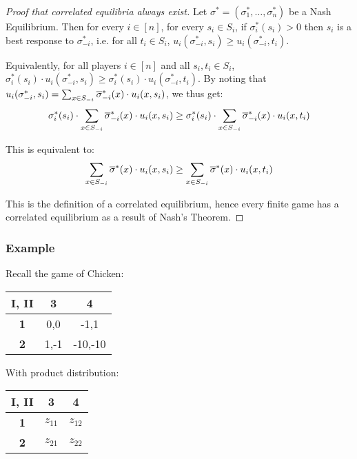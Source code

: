 	\begin{proof}[Proof that correlated equilibria always exist]
		Let $\sigma^* = (\sigma^*_1, \ldots, \sigma^*_n)$ be a Nash
		Equilibrium.  Then for every $i \in [n]$, for every $s_i \in S_i$, if
		$\sigma^*_i(s_i) > 0$ then $s_i$ is a best response to $\sigma^*_{-i}$,
		i.e. for all $t_i \in S_i$, $u_i(\sigma^*_{-i}, s_i) \ge
		u_i(\sigma^*_{-i}, t_i)$.

		Equivalently, for all players $i \in [n]$ and all $s_i, t_i \in S_i$,
		$\sigma^*_i (s_i) \cdot u_i(\sigma^*_{-i}, s_i) \ge \sigma^*_i (s_i) \cdot
		u_i(\sigma^*_{-i}, t_i)$. By noting that $u_i(\sigma^*_{-i}, s_i) =
		\sum_{x \in S_{-i}} \overline{\sigma}^*_{-i} (x) \cdot u_i(x, s_i)$, we
		thus get:
		\begin{equation*}
			\sigma^*_i (s_i) \cdot \sum_{x \in S_{-i}} \overline{\sigma}^*_{-i} (x)
			\cdot u_i(x, s_i) \ge \sigma^*_i (s_i) \cdot \sum_{x \in S_{-i}}
			\overline{\sigma}^*_{-i} (x) \cdot u_i(x, t_i)
		\end{equation*}

		This is equivalent to:
		\begin{equation*}
			\sum_{x \in S_{-i}} \overline{\sigma}^* (x) \cdot u_i(x, s_i) \ge
			\sum_{x \in S_{-i}} \overline{\sigma}^* (x) \cdot u_i(x, t_i)
		\end{equation*}

		This is the definition of a correlated equilibrium, hence every finite
		game has a correlated equilibrium as a result of Nash's Theorem.
	\end{proof}

	\subsubsection{Example}
		Recall the game of Chicken:
		\begin{center}
			\begin{tabular}{|c|c|c|}
				\hline
				\textbf{I, II} & \textbf{3} & \textbf{4} \\ \hline
				\textbf{1}     & 0,0        & -1,1 \\ \hline
				\textbf{2}     & 1,-1       & -10,-10 \\ \hline
			\end{tabular}
		\end{center}
		
		With product distribution:
		\begin{center}
			\begin{tabular}{|c|c|c|}
				\hline
				\textbf{I, II} & \textbf{3} & \textbf{4} \\ \hline
				\textbf{1}     & $z_{11}$   & $z_{12}$ \\ \hline
				\textbf{2}     & $z_{21}$   & $z_{22}$ \\ \hline
			\end{tabular}
		\end{center}

